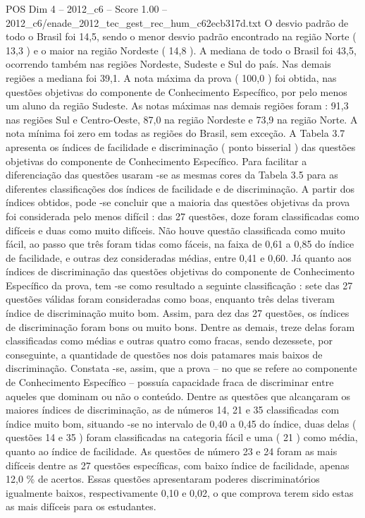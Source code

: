 \begin{textsample}{POS Dim 4 – 2012\_c6 – Score 1.00 – 2012\_c6/enade\_2012\_tec\_gest\_rec\_hum\_c62ecb317d.txt}
O desvio padrão de todo o Brasil foi 14,5, sendo o menor desvio padrão encontrado na região Norte ( 13,3 ) e o maior na região Nordeste ( 14,8 ).
A mediana de todo o Brasil foi 43,5, ocorrendo também nas regiões Nordeste, Sudeste e Sul do país.
Nas demais regiões a mediana foi 39,1.
A nota máxima da prova ( 100,0 ) foi obtida, nas questões objetivas do componente de Conhecimento Específico, por pelo menos um aluno da região Sudeste.
As notas máximas nas demais regiões foram : 91,3 nas regiões Sul e Centro-Oeste, 87,0 na região Nordeste e 73,9 na região Norte.
A nota mínima foi zero em todas as regiões do Brasil, sem exceção.
A Tabela 3.7 apresenta os índices de facilidade e discriminação ( ponto bisserial ) das questões objetivas do componente de Conhecimento Específico.
Para facilitar a diferenciação das questões usaram -se as mesmas cores da Tabela 3.5 para as diferentes classificações dos índices de facilidade e de discriminação.
A partir dos índices obtidos, pode -se concluir que a maioria das questões objetivas da prova foi considerada pelo menos difícil : das 27 questões, doze foram classificadas como difíceis e duas como muito difíceis.
Não houve questão classificada como muito fácil, ao passo que três foram tidas como fáceis, na faixa de 0,61 a 0,85 do índice de facilidade, e outras dez consideradas médias, entre 0,41 e 0,60.
Já quanto aos índices de discriminação das questões objetivas do componente de Conhecimento Específico da prova, tem -se como resultado a seguinte classificação : sete das 27 questões válidas foram consideradas como boas, enquanto três delas tiveram índice de discriminação muito bom.
Assim, para dez das 27 questões, os índices de discriminação foram bons ou muito bons.
Dentre as demais, treze delas foram classificadas como médias e outras quatro como fracas, sendo dezessete, por conseguinte, a quantidade de questões nos dois patamares mais baixos de discriminação.
Constata -se, assim, que a prova – no que se refere ao componente de Conhecimento Específico – possuía capacidade fraca de discriminar entre aqueles que dominam ou não o conteúdo.
Dentre as questões que alcançaram os maiores índices de discriminação, as de números 14, 21 e 35 classificadas com índice muito bom, situando -se no intervalo de 0,40 a 0,45 do índice, duas delas ( questões 14 e 35 ) foram classificadas na categoria fácil e uma ( 21 ) como média, quanto ao índice de facilidade.
As questões de número 23 e 24 foram as mais difíceis dentre as 27 questões específicas, com baixo índice de facilidade, apenas 12,0 \% de acertos.
Essas questões apresentaram poderes discriminatórios igualmente baixos, respectivamente 0,10 e 0,02, o que comprova terem sido estas as mais difíceis para os estudantes.

\end{textsample}
